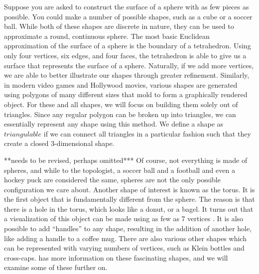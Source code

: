 \documentclass[12pt]{article}
\begin{document}
Suppose you are asked to construct the surface of a sphere with as few pieces as possible. You could make a number of possible shapes, such as a cube or a soccer ball. While both of these shapes are discrete in nature, they can be used to approximate a round, continuous sphere. The most basic Euclidean approximation of the surface of a sphere is the boundary of a tetrahedron. Using only four vertices, six edges, and four faces, the tetrahedron is able to give us a surface that represents the surface of a sphere. Naturally, if we add more vertices, we are able to better illustrate our shapes through greater refinement. Similarly, in modern video games and Hollywood movies, various shapes are generated using polygons of many different sizes that mold to form a graphically rendered object. For these and all shapes, we will focus on building them solely out of triangles. Since any regular polygon can be broken up into triangles, we can essentially represent any shape using this method. We define a shape as $triangulable$ if we can connect all triangles in a particular fashion such that they create a closed 3-dimensional shape.\newline
  
\noindent ***needs to be revised, perhaps omitted*** Of course, not everything is made of spheres, and while to the topologist, a soccer ball and a football and even a hockey puck are considered the same, spheres are not the only possible configuration we care about. Another shape of interest is known as the torus. It is the first object that is fundamentally different from the sphere. The reason is that there is a hole in the torus, which looks like a donut, or a bagel. It turns out that a visualization of this object can be made using as few as 7 vertices \cite{lutzmanifold}. It is also possible to add ``handles'' to any shape, resulting in the addition of another hole, like adding a handle to a coffee mug. There are also various other shapes which can be represented with varying numbers of vertices, such as Klein bottles and cross-caps. \cite{WolfMath} has more information on these fascinating shapes, and we will examine some of these further on.\newline
 
\end{document}
